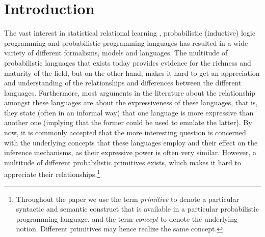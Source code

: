 \documentclass[a4paper]{article}
\begin{document}
\section{Introduction}
\label{sec:intro}
The vast interest in statistical relational learning \citep{Getoor07:book}, probabilistic (inductive) logic programming \citep{DeRaedt07-APRIL} and probabilistic programming languages \citep{GoodmannNIPSWS} has resulted in a wide variety of different formalisms, models and languages. 
The multitude of probabilistic languages that exists today provides evidence for the richness and maturity of the field, but on the other hand, makes it hard to get an appreciation and understanding of the relationships and differences between the different languages. 
Furthermore, most arguments in the literature about the relationship amongst these languages are about the 
expressiveness of these languages, that is, they state (often in an informal way) that one language is more expressive than another one (implying that the former could be used to emulate the latter).   By now, it is commonly accepted that 
the more interesting question is concerned with the underlying concepts that these languages employ
and their effect on the inference mechanisms, as their expressive power is often very similar.   However, 
a multitude of different probabilistic primitives exists, which makes it hard to 
appreciate their relationships.\footnote{Throughout the paper we use the term \emph{primitive} to denote a particular syntactic and semantic
construct that is available in a particular probabilistic programming
language, and the term \emph{concept} to denote the 
underlying notion. Different primitives may hence realize the same concept. }
\end{document}
